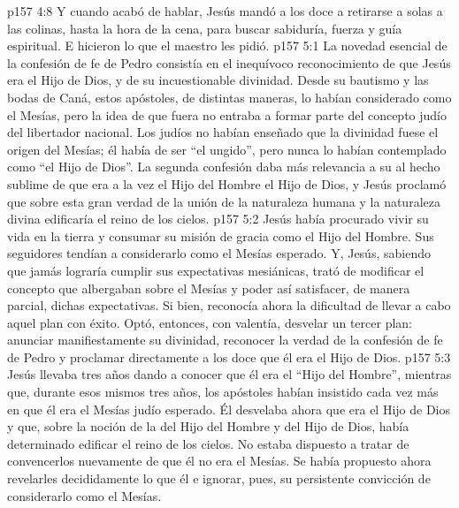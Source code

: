 \vs p157 4:8 \pc Y cuando acabó de hablar, Jesús mandó a los doce a retirarse a solas a las colinas, hasta la hora de la cena, para buscar sabiduría, fuerza y guía espiritual. E hicieron lo que el maestro les pidió.
\vs p157 5:1 La novedad esencial de la confesión de fe de Pedro consistía en el inequívoco reconocimiento de que Jesús era el Hijo de Dios, y de su incuestionable divinidad. Desde su bautismo y las bodas de Caná, estos apóstoles, de distintas maneras, lo habían considerado como el Mesías, pero la idea de que fuera  no entraba a formar parte del concepto judío del libertador nacional. Los judíos no habían enseñado que la divinidad fuese el origen del Mesías; él había de ser “el ungido”, pero nunca lo habían contemplado como “el Hijo de Dios”. La segunda confesión daba más relevancia a su  al hecho sublime de que era a la vez el Hijo del Hombre  el Hijo de Dios, y Jesús proclamó que sobre esta gran verdad de la unión de la naturaleza humana y la naturaleza divina edificaría el reino de los cielos.
\vs p157 5:2 Jesús había procurado vivir su vida en la tierra y consumar su misión de gracia como el Hijo del Hombre. Sus seguidores tendían a considerarlo como el Mesías esperado. Y, Jesús, sabiendo que jamás lograría cumplir sus expectativas mesiánicas, trató de modificar el concepto que albergaban sobre el Mesías y poder así satisfacer, de manera parcial, dichas expectativas. Si bien, reconocía ahora la dificultad de llevar a cabo aquel plan con éxito. Optó, entonces, con valentía, desvelar un tercer plan: anunciar manifiestamente su divinidad, reconocer la verdad de la confesión de fe de Pedro y proclamar directamente a los doce que él era el Hijo de Dios.
\vs p157 5:3 Jesús llevaba tres años dando a conocer que él era el “Hijo del Hombre”, mientras que, durante esos mismos tres años, los apóstoles habían insistido cada vez más en que él era el Mesías judío esperado. Él desvelaba ahora que era el Hijo de Dios y que, sobre la noción de la  del Hijo del Hombre y del Hijo de Dios, había determinado edificar el reino de los cielos. No estaba dispuesto a tratar de convencerlos nuevamente de que él no era el Mesías. Se había propuesto ahora revelarles decididamente lo que él  e ignorar, pues, su persistente convicción de considerarlo como el Mesías.
